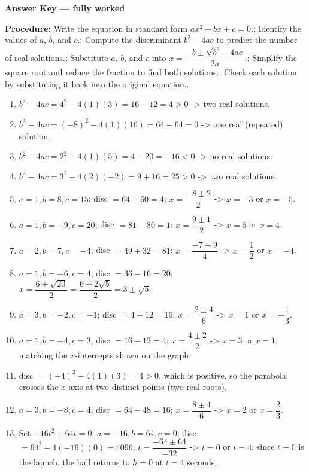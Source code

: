 \documentclass[12pt]{article}
\begin{document}
\begin{center}{\Large \textbf{Answer Key --- fully worked}}\end{center}
\vspace{0.25cm}
\textbf{Procedure:} Write the equation in standard form $ax^2+bx+c=0$.; Identify the values of $a$, $b$, and $c$.; Compute the discriminant $b^2-4ac$ to predict the number of real solutions.; Substitute $a$, $b$, and $c$ into $x=\dfrac{-b\pm\sqrt{b^2-4ac}}{2a}$.; Simplify the square root and reduce the fraction to find both solutions.; Check each solution by substituting it back into the original equation..\\[8pt]
\begin{enumerate}[label=\textbf{\arabic*.},itemsep=7pt]
  \item $b^2-4ac=4^2-4(1)(3)=16-12=4>0$ -> two real solutions.
  \item $b^2-4ac=(-8)^2-4(1)(16)=64-64=0$ -> one real (repeated) solution.
  \item $b^2-4ac=2^2-4(1)(5)=4-20=-16<0$ -> no real solutions.
  \item $b^2-4ac=3^2-4(2)(-2)=9+16=25>0$ -> two real solutions.
  \item $a=1,b=8,c=15$; disc $=64-60=4$; $x=\dfrac{-8\pm 2}{2}$ -> $x=-3$ or $x=-5$.
  \item $a=1,b=-9,c=20$; disc $=81-80=1$; $x=\dfrac{9\pm 1}{2}$ -> $x=5$ or $x=4$.
  \item $a=2,b=7,c=-4$; disc $=49+32=81$; $x=\dfrac{-7\pm 9}{4}$ -> $x=\dfrac{1}{2}$ or $x=-4$.
  \item $a=1,b=-6,c=4$; disc $=36-16=20$; $x=\dfrac{6\pm\sqrt{20}}{2}=\dfrac{6\pm 2\sqrt{5}}{2}=3\pm\sqrt{5}$.
  \item $a=3,b=-2,c=-1$; disc $=4+12=16$; $x=\dfrac{2\pm 4}{6}$ -> $x=1$ or $x=-\dfrac{1}{3}$.
  \item $a=1,b=-4,c=3$; disc $=16-12=4$; $x=\dfrac{4\pm 2}{2}$ -> $x=3$ or $x=1$, matching the $x$-intercepts shown on the graph.
  \item disc $=(-4)^2-4(1)(3)=4>0$, which is positive, so the parabola crosses the $x$-axis at two distinct points (two real roots).
  \item $a=3,b=-8,c=4$; disc $=64-48=16$; $x=\dfrac{8\pm 4}{6}$ -> $x=2$ or $x=\dfrac{2}{3}$.
  \item Set $-16t^2+64t=0$: $a=-16,b=64,c=0$; disc $=64^2-4(-16)(0)=4096$; $t=\dfrac{-64\pm 64}{-32}$ -> $t=0$ or $t=4$; since $t=0$ is the launch, the ball returns to $h=0$ at $t=4$ seconds.
\end{enumerate}
\end{document}
